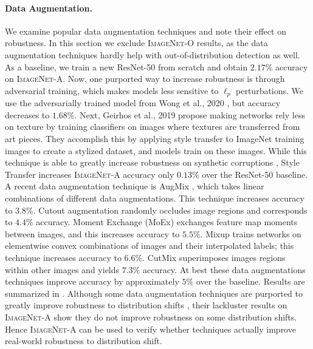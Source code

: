 \documentclass[10pt,twocolumn,letterpaper]{article}
\begin{document}
\paragraph{Data Augmentation.}
We examine popular data augmentation techniques and note their effect on robustness. In this section we exclude \textsc{ImageNet-O} results, as the data augmentation techniques hardly help with out-of-distribution detection as well.
As a baseline, we train a new ResNet-50 from scratch and obtain $2.17\%$ accuracy on \textsc{ImageNet-A}.
Now, one purported way to increase robustness is through adversarial training, which makes models less sensitive to $\ell_p$ perturbations. We use the adversarially trained model from Wong et al., 2020 \cite{wong2020fast}, but accuracy decreases to $1.68\%$. Next, Geirhos et al., 2019 \cite{geirhos2019} propose making networks rely less on texture by training classifiers on images where textures are transferred from art pieces. They accomplish this by applying style transfer to ImageNet training images to create a stylized dataset, and models train on these images. While this technique is able to greatly increase robustness on synthetic corruptions \cite{hendrycks2019robustness}, Style Transfer increases \textsc{ImageNet-A} accuracy only $0.13\%$ over the ResNet-50 baseline. A recent data augmentation technique is AugMix \cite{hendrycks2019augmix}, which takes linear combinations of different data augmentations. This technique increases accuracy to $3.8\%$. Cutout augmentation \cite{Devries2017ImprovedRO} randomly occludes image regions and corresponds to $4.4\%$ accuracy. Moment Exchange (MoEx) \cite{Li2020OnFN} exchanges feature map moments between images, and this increases accuracy to $5.5\%$. Mixup \cite{Zhang2018mixupBE} trains networks on elementwise convex combinations of images and their interpolated labels; this technique increases accuracy to $6.6\%$. CutMix \cite{Yun2019CutMixRS} superimposes images regions within other images and yields $7.3\%$ accuracy. At best these data augmentations techniques improve accuracy by approximately $5\%$ over the baseline. Results are summarized in . Although some data augmentation techniques are purported to greatly improve robustness to distribution shifts \cite{hendrycks2019augmix,Yin2019AFP}, their lackluster results on \textsc{ImageNet-A} show they do not improve robustness on some distribution shifts. Hence \textsc{ImageNet-A} can be used to verify whether techniques actually improve real-world robustness to distribution shift.
\end{document}
